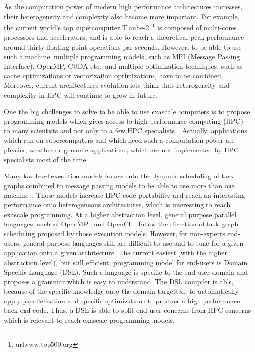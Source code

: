 As the computation power of modern high performance architectures increases, their heterogeneity and complexity also become more important. For example, the current world's top supercomputer Tianhe-2~\footnote{url{www.top500.org}} is composed of multi-cores processors and accelerators, and is able to reach a theoretical peak performance around thirty floating point operations par seconds. However, to be able to use such a machine, multiple programming models, such as MPI (Message Passing Interface), OpenMP, CUDA etc., and multiple optimization techniques, such as cache optimizations or vectorization optimizations, have to be combined. Moreover, current architectures evolution lets think that heterogeneity and complexity in HPC will continue to grow in future.

One the big challenges to solve to be able to use exascale computers is to propose programming models which gives access to high performance computing (HPC) to many scientists and not only to a few HPC specialists~\cite{ETP4HPC2013}. Actually, applications which run on supercomputers and which need such a computation power are physics, weather or genomic applications, which are not implemented by HPC specialists most of the time.

Many low level execution models focuss onto the dynamic scheduling of task graphs combined to message passing models to be able to use more than one machine~\cite{Gautier:2013:XRS:2510661.2511383,Augonnet2011,wu:hal-01078359}. Those models increase HPC code portability and reach an interesting performance onto heterogeneous architectures, which is interesting to reach exascale programming. At a higher abstraction level, general purpose parallel languages, such as OpenMP~\cite{660313} and OpenCL~\cite{Stone:2010:OPP:622179.1803953} follow the direction of task graph scheduling proposed by those execution models. However, for non-experts end-users, general purpose languages still are difficult to use and to tune for a given application onto a given architecture. The current easiest (with the higher abstraction level), but still efficient, programming model for end-users is Domain Specific Language (DSL). Such a language is specific to the end-user domain and proposes a grammar which is easy to understand. The DSL compiler is able, because of the specific knowledge onto the domain targetted, to automatically apply parallelization and specific optimizations to produce a high performance back-end code. Thus, a DSL is able to split end-user concerns from HPC concerns which is relevant to reach exascale programming models.

